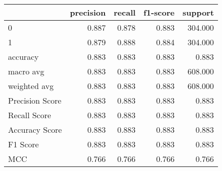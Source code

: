 \begin{tabular}{lrrrr}
\toprule
{} &  precision &  recall &  f1-score &  support \\
\midrule
0               &      0.887 &   0.878 &     0.883 &  304.000 \\
1               &      0.879 &   0.888 &     0.884 &  304.000 \\
accuracy        &      0.883 &   0.883 &     0.883 &    0.883 \\
macro avg       &      0.883 &   0.883 &     0.883 &  608.000 \\
weighted avg    &      0.883 &   0.883 &     0.883 &  608.000 \\
Precision Score &      0.883 &   0.883 &     0.883 &    0.883 \\
Recall Score    &      0.883 &   0.883 &     0.883 &    0.883 \\
Accuracy Score  &      0.883 &   0.883 &     0.883 &    0.883 \\
F1 Score        &      0.883 &   0.883 &     0.883 &    0.883 \\
MCC             &      0.766 &   0.766 &     0.766 &    0.766 \\
\bottomrule
\end{tabular}
